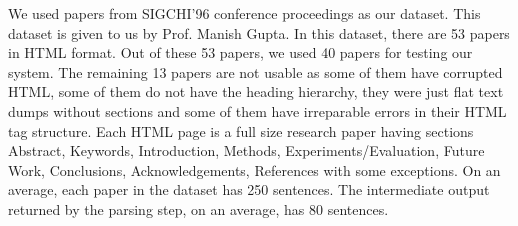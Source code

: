 We used papers from SIGCHI'96 conference proceedings as our dataset. This dataset is given to us by Prof. Manish Gupta. In this dataset, there are 53 papers in HTML format. Out of these 53 papers, we used 40 papers for testing our system. The remaining 13 papers are not usable as some of them have corrupted HTML, some of them do not have the heading hierarchy, they were just flat text dumps without sections and some of them have irreparable errors in their HTML tag structure.
Each HTML page is a full size research paper having sections Abstract, Keywords, Introduction, Methods, Experiments/Evaluation, Future Work, Conclusions, Acknowledgements, References with some exceptions. On an average, each paper in the dataset has 250 sentences. The intermediate output returned by the parsing step, on an average, has 80 sentences.
